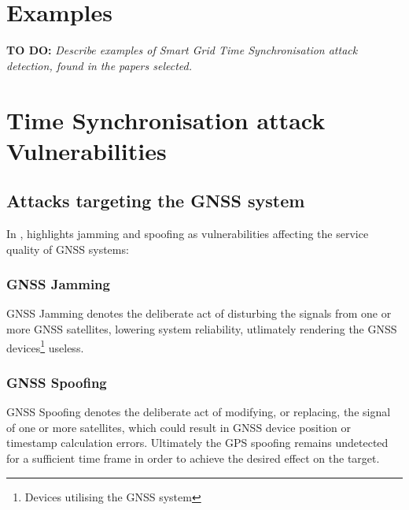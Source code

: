 \section{Examples}


\textbf{TO DO:}
\textit{Describe examples of Smart Grid Time Synchronisation attack detection, found in the papers selected. }\\ 



 \section{Time Synchronisation attack Vulnerabilities}












 


 
\subsection{Attacks targeting the GNSS system}

In \cite{schmidt2016survey}, \citeauthor{schmidt2016survey} highlights jamming and spoofing as vulnerabilities affecting the service quality of GNSS systems:


\subsubsection{GNSS Jamming}
GNSS Jamming denotes the deliberate act of disturbing the signals from one or more GNSS satellites, lowering system reliability, utlimately rendering the GNSS devices\footnote{Devices utilising the GNSS system} useless. 
\subsubsection{GNSS Spoofing} 
GNSS Spoofing denotes the deliberate act of modifying, or replacing, the signal of one or more satellites, which could result in GNSS device position or timestamp calculation errors. Ultimately the GPS spoofing remains undetected for a sufficient time frame in order to achieve the desired effect on the target.





